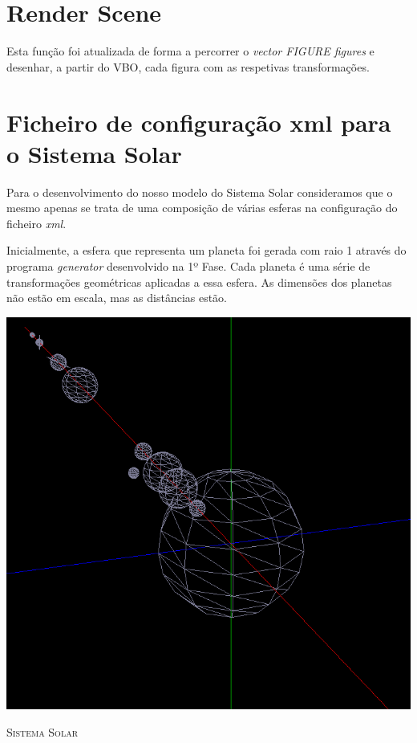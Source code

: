 \documentclass[11pt,a4paper]{report}
\begin{document}
\section{Render Scene}
Esta função foi atualizada de forma a percorrer o \emph{vector FIGURE figures} e desenhar, a partir do VBO, cada figura com as respetivas transformações.
\section{Ficheiro de configuração xml para o Sistema Solar}
Para o desenvolvimento do nosso modelo do Sistema Solar consideramos que o mesmo apenas se trata de uma composição de várias esferas na configuração do ficheiro  \emph{xml}.

Inicialmente, a esfera que representa um planeta foi gerada com raio 1 através do programa \emph{generator} desenvolvido na 1º Fase. Cada planeta é uma série de transformações geométricas aplicadas a essa esfera. As dimensões dos planetas não estão em escala, mas as distâncias estão.

\begin{minipage}{0.9\linewidth}
        \centering
		\includegraphics[width=\textwidth]{sistema_solar.png}\par\vspace{1cm}
                {\scshape\large Sistema Solar} \par
\end{minipage}
\end{document}
